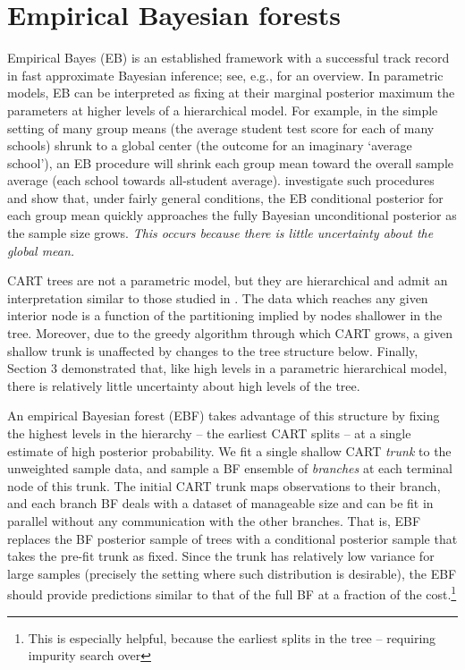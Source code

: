 \documentclass{article}
\begin{document}

\section{Empirical Bayesian forests}

Empirical Bayes (EB) is an established framework with a
successful track record in fast approximate Bayesian inference; see,
e.g., \citet{efron_large-scale_2010} for an overview. In parametric
models, EB can be interpreted as fixing at their marginal posterior
maximum  the parameters at higher levels of a hierarchical
model. For example, in the simple setting of many group means (the
average student test score for each of many schools) shrunk to a global center (the outcome for an imaginary `average school'),
an EB procedure will shrink each group mean toward the overall sample average (each school towards all-student average). \citet{kass_approximate_1989}
investigate such procedures and show that, under fairly general
conditions, the EB conditional posterior for each group mean  quickly
approaches the fully Bayesian unconditional posterior as the sample size
grows.  \textit{This occurs because there is little uncertainty about the global mean.}

CART trees are not a parametric model, but they are hierarchical and
admit an interpretation similar to those studied in
\citet{kass_approximate_1989}. The data which reaches any given interior
node is a function of the partitioning implied by nodes shallower in the
tree. Moreover, due to the greedy algorithm through which CART
grows, a given shallow trunk is unaffected by changes to the tree
structure below. Finally, Section 3 demonstrated that, like high levels in a parametric hierarchical model, there is relatively little uncertainty about high levels of the tree.

An empirical Bayesian forest (EBF) takes advantage of this structure by fixing
the highest levels in the hierarchy -- the earliest CART splits -- at a single
estimate of high posterior probability. We fit a single
shallow CART \textit{trunk} to the unweighted sample data, and  sample a
BF ensemble of \textit{branches} at each terminal node of this trunk.  The
initial CART trunk  maps observations to their branch, and each branch BF
deals with a dataset of manageable size and can be fit in parallel without any
communication with the other branches. That is, EBF replaces the BF posterior
sample of trees with a conditional posterior sample that takes the pre-fit
trunk as fixed. Since the trunk has relatively low variance for large samples
(precisely the setting where such distribution is desirable), the EBF should
provide predictions similar to that of the full BF at a fraction of the cost.\footnote{This is especially helpful, because the earliest splits in the tree -- requiring impurity search over }
\end{document}
